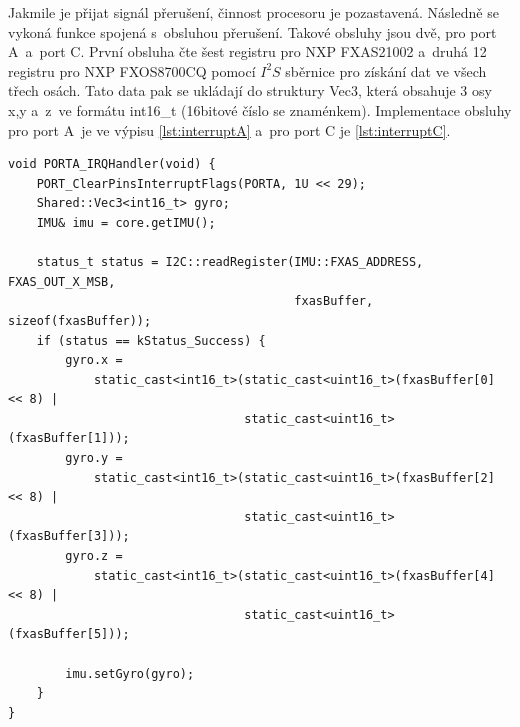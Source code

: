 Jakmile je přijat signál přerušení, činnost procesoru je pozastavená. Následně se vykoná funkce spojená s~obsluhou přerušení. Takové obsluhy jsou dvě, pro port A~a~port C. 
První obsluha čte šest registru pro NXP FXAS21002 a~druhá 12 registru pro NXP 
FXOS8700CQ pomocí $I^2S$ sběrnice pro získání dat ve všech třech osách. Tato data 
pak se ukládají do struktury Vec3, která obsahuje 3 osy x,y a~z~ve formátu 
int16\_t (16bitové číslo se znaménkem). Implementace obsluhy pro port A~je ve výpisu 
\ref{lst:interruptA} a~pro port C je \ref{lst:interruptC}.

\begin{lstlisting}[caption = Funkce obsluhy přerušení na portu A, label = lst:interruptA]
void PORTA_IRQHandler(void) {
    PORT_ClearPinsInterruptFlags(PORTA, 1U << 29);
    Shared::Vec3<int16_t> gyro;
    IMU& imu = core.getIMU();

    status_t status = I2C::readRegister(IMU::FXAS_ADDRESS, FXAS_OUT_X_MSB,
                                        fxasBuffer, sizeof(fxasBuffer));
    if (status == kStatus_Success) {
        gyro.x =
            static_cast<int16_t>(static_cast<uint16_t>(fxasBuffer[0] << 8) |
                                 static_cast<uint16_t>(fxasBuffer[1]));
        gyro.y =
            static_cast<int16_t>(static_cast<uint16_t>(fxasBuffer[2] << 8) |
                                 static_cast<uint16_t>(fxasBuffer[3]));
        gyro.z =
            static_cast<int16_t>(static_cast<uint16_t>(fxasBuffer[4] << 8) |
                                 static_cast<uint16_t>(fxasBuffer[5]));

        imu.setGyro(gyro);
    }
}
\end{lstlisting}

